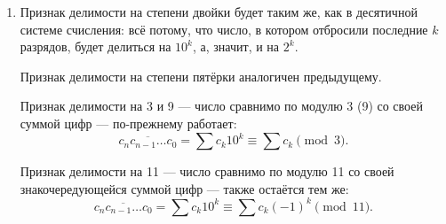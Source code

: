\begin{enumerate}
\item Признак делимости на степени двойки будет таким же, как в десятичной системе счисления: всё потому, что число, в котором отбросили последние $k$ разрядов, будет делиться на $10^k$, а, значит, и на $2^k$.

Признак делимости на степени пятёрки аналогичен предыдущему.

Признак делимости на 3 и 9 — число сравнимо по модулю 3 (9) со своей суммой цифр — по-прежнему работает:
$$\overline{c_nc_{n-1}\ldots c_0} = \sum c_k10^k \equiv \sum c_k \pmod 3.$$

Признак делимости на 11 — число сравнимо по модулю 11 со своей знакочередующейся суммой цифр — также остаётся тем же:
$$\overline{c_nc_{n-1}\ldots c_0} = \sum c_k10^k \equiv \sum c_k(-1)^k \pmod{11}.$$

\end{enumerate}